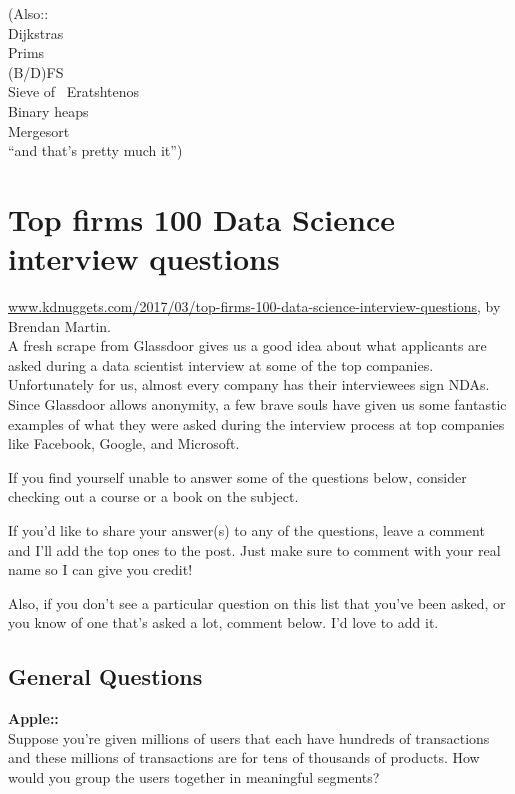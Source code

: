 \documentclass[11pt]{article}
\begin{document}
\noindent
(Also:: \\
Dijkstras\\
Prims \\
(B/D)FS \\
Sieve of ~Eratshtenos \\
Binary heaps\\
Mergesort\\
``and that's pretty much it'')




\newpage
\section{Top firms 100 Data Science interview questions}
\href{http://www.kdnuggets.com/2017/03/top-firms-100-data-science-interview-questions.html}{www.kdnuggets.com/2017/03/top-firms-100-data-science-interview-questions}, by Brendan Martin.\\

A fresh scrape from Glassdoor gives us a good idea about what
applicants are asked during a data scientist interview at some of the
top companies. Unfortunately for us, almost every company has their
interviewees sign NDAs. Since Glassdoor allows anonymity, a few brave
souls have given us some fantastic examples of what they were asked
during the interview process at top companies like Facebook, Google,
and Microsoft.

If you find yourself unable to answer some of the questions below,
consider checking out a course or a book on the subject.

If you’d like to share your answer(s) to any of the questions, leave a
comment and I’ll add the top ones to the post. Just make sure to
comment with your real name so I can give you credit!

Also, if you don’t see a particular question on this list that you’ve
been asked, or you know of one that’s asked a lot, comment below. I’d
love to add it.


\subsection{General Questions}

{\bf Apple:: }\\
Suppose you’re given millions of users that each have hundreds of transactions and these millions of transactions are for tens of thousands of products. How would you group the users together in meaningful segments?\\
\end{document}
